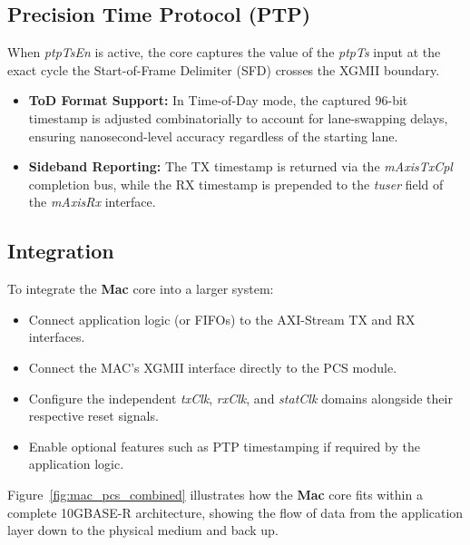 \subsection{Precision Time Protocol (PTP)}
When \textit{ptpTsEn} is active, the core captures the value of the \textit{ptpTs} input at the exact cycle the Start-of-Frame Delimiter (SFD) crosses the XGMII boundary. 
\begin{itemize}
    \item \textbf{ToD Format Support:} In Time-of-Day mode, the captured 96-bit timestamp is adjusted combinatorially to account for lane-swapping delays, ensuring nanosecond-level accuracy regardless of the starting lane.
    \item \textbf{Sideband Reporting:} The TX timestamp is returned via the \textit{mAxisTxCpl} completion bus, while the RX timestamp is prepended to the \textit{tuser} field of the \textit{mAxisRx} interface.
\end{itemize}

\subsection{Integration}
To integrate the \textbf{Mac} core into a larger system:
\begin{itemize}
    \item Connect application logic (or FIFOs) to the AXI-Stream TX and RX interfaces.
    \item Connect the MAC's XGMII interface directly to the PCS module.
    \item Configure the independent \textit{txClk}, \textit{rxClk}, and \textit{statClk} domains alongside their respective reset signals.
    \item Enable optional features such as PTP timestamping if required by the application logic.
\end{itemize}

Figure~\ref{fig:mac_pcs_combined} illustrates how the \textbf{Mac} core fits within a complete 10GBASE-R architecture, showing the flow of data from the application layer down to the physical medium and back up.

